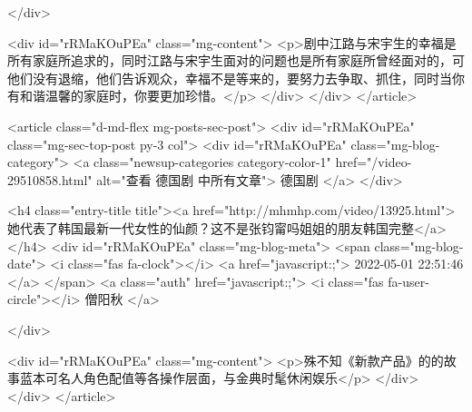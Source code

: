                                             </div>


                                            <div id="rRMaKOuPEa"  class="mg-content">
                                                <p>剧中江路与宋宇生的幸福是所有家庭所追求的，同时江路与宋宇生面对的问题也是所有家庭所曾经面对的，可他们没有退缩，他们告诉观众，幸福不是等来的，要努力去争取、抓住，同时当你有和谐温馨的家庭时，你要更加珍惜。</p>
                                            </div>
                                        </div>
                                    </article>
                                    
                                    <article class="d-md-flex mg-posts-sec-post">
                                        <div id="rRMaKOuPEa"  class="mg-sec-top-post py-3 col">
                                            <div id="rRMaKOuPEa"  class="mg-blog-category">
                                                <a class="newsup-categories category-color-1" href="/video-29510858.html" alt="查看 德国剧 中所有文章">
                                                    德国剧
                                                </a>
                                            </div>

                                            <h4 class="entry-title title"><a href="http://mhmhp.com/video/13925.html">她代表了韩国最新一代女性的仙颜？这不是张钧甯吗姐姐的朋友韩国完整</a></h4>
                                            <div id="rRMaKOuPEa"  class="mg-blog-meta">
                                                <span class="mg-blog-date">
                                                    <i class="fas fa-clock"></i>
                                                    <a href="javascript:;">
                                                        2022-05-01 22:51:46
                                                    </a>
                                                </span>
                                                <a class="auth" href="javascript:;">
                                                    <i class="fas fa-user-circle"></i>
                                                    僧阳秋
                                                </a>

                                            </div>


                                            <div id="rRMaKOuPEa"  class="mg-content">
                                                <p>殊不知《新款产品》的的故事蓝本可名人角色配值等各操作层面，与金典时髦休闲娱乐</p>
                                            </div>
                                        </div>
                                    </article>
                                    
